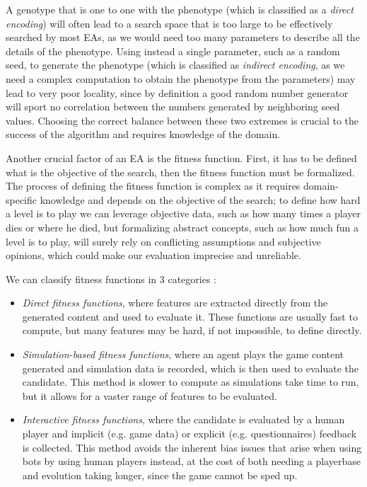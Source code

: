 \documentclass{Configuration_Files/PoliMi3i_thesis}
\begin{document}
A genotype that is one to one with the phenotype (which is classified as a \textit{direct encoding}) will often lead to a search space that is too large to be effectively searched by most EAs, as we would need too many parameters to describe all the details of the phenotype. Using instead a single parameter, such as a random seed, to generate the phenotype (which is classified as \textit{indirect encoding}, as we need a complex computation to obtain the phenotype from the parameters) may lead to very poor locality, since by definition a good random number generator will sport no correlation between the numbers generated by neighboring seed values. Choosing the correct balance between these two extremes is crucial to the success of the algorithm and requires knowledge of the domain. \cite{togelius_search-based_2010}

Another crucial factor of an EA is the fitness function. First, it has to be defined what is the objective of the search, then the fitness function must be formalized. The process of defining the fitness function is complex as it requires domain-specific knowledge and depends on the objective of the search; to define how hard a level is to play we can leverage objective data, such as how many times a player dies or where he died, but formalizing abstract concepts, such as how much fun a level is to play, will surely rely on conflicting assumptions and subjective opinions, which could make our evaluation imprecise and unreliable. \cite{togelius_search-based_2010}

We can classify fitness functions in 3 categories \cite{togelius_search-based_2010}:
\begin{itemize}
    \item \textit{Direct fitness functions}, where features are extracted directly from the generated content and used to evaluate it. These functions are usually fast to compute, but many features may be hard, if not impossible, to define directly.
    \item \textit{Simulation-based fitness functions}, where an agent plays the game content generated and simulation data is recorded, which is then used to evaluate the candidate. This method is slower to compute as simulations take time to run, but it allows for a vaster range of features to be evaluated. 
    \item \textit{Interactive fitness functions}, where the candidate is evaluated by a human player and implicit (e.g. game data) or explicit (e.g. questionnaires) feedback is collected. This method avoids the inherent bias issues that arise when using bots by using human players instead, at the cost of both needing a playerbase and evolution taking longer, since the game cannot be sped up.  
\end{itemize}
\end{document}
